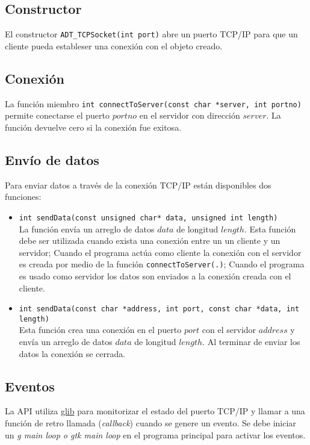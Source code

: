 \documentclass[a4paper,10pt]{article}
\begin{document}
  \subsection{Constructor}
    El constructor \texttt{ADT\_TCPSocket(int port)} abre un puerto TCP/IP para que un cliente pueda estableser una conexión con el objeto creado.
	
  \subsection{Conexión}
    La función miembro \texttt{int connectToServer(const char *server, int portno)} permite conectarse el puerto $portno$ en el servidor con dirección $server$. La función devuelve cero si la conexión fue exitosa.

  \subsection{Envío de datos}
    Para enviar datos a través de la conexión TCP/IP están disponibles dos funciones:

  \begin{itemize}
   \item   \texttt{int sendData(const unsigned char* data, unsigned int length)}\\
	    La función envía un arreglo de datos $data$ de longitud $length$. Esta función debe ser utilizada cuando exista una conexión entre un un cliente y un servidor; Cuando el programa actúa como cliente la conexión con el servidor es creada por medio de la función \texttt{connectToServer(.)}; Cuando el programa es usado como servidor los datos son enviados a la conexión creada con el cliente.

   \item  \texttt{int sendData(const char *address, int port, const char *data,  int length)}\\
	  Esta función crea una conexión en el puerto $port$ con el servidor $address$ y envía un arreglo de datos $data$ de longitud $length$. Al terminar de enviar los datos la conexión se cerrada.


  \end{itemize}



\subsection{Eventos}
La API utiliza \href{http://library.gnome.org/devel/glib/}{glib} para monitorizar el estado del puerto TCP/IP y llamar a una función de retro llamada (\textit{callback}) cuando se genere un evento. Se debe iniciar un \textit{ g main loop o gtk main loop} en el programa principal para activar los eventos.
\end{document}
